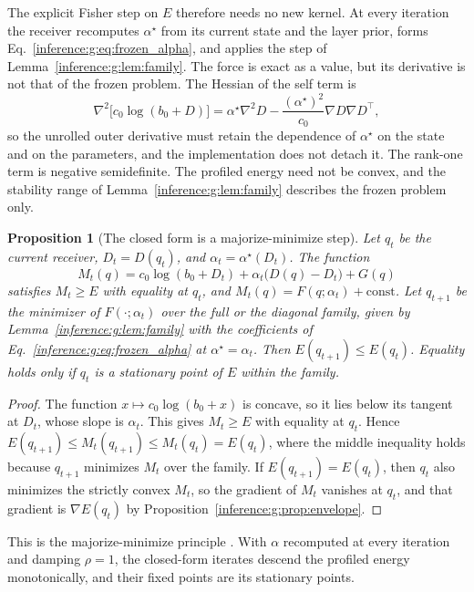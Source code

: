 \documentclass[11pt]{article}
\newtheorem{proposition}[theorem]{Proposition}
\theoremstyle{definition}
\theoremstyle{remark}
\begin{document}
The explicit Fisher step on $E$ therefore needs no new kernel. At every iteration the receiver recomputes $\alpha^\star$ from its current state and the layer prior, forms Eq.~\eqref{inference:g:eq:frozen_alpha}, and applies the step of Lemma~\ref{inference:g:lem:family}. The force is exact as a value, but its derivative is not that of the frozen problem. The Hessian of the self term is
\begin{equation}
\nabla^2\bigl[c_0\log(b_0+D)\bigr]=\alpha^\star\nabla^2D-\frac{(\alpha^\star)^2}{c_0}\nabla D\nabla D^\top,
\end{equation}
so the unrolled outer derivative must retain the dependence of $\alpha^\star$ on the state and on the parameters, and the implementation does not detach it. The rank-one term is negative semidefinite. The profiled energy need not be convex, and the stability range of Lemma~\ref{inference:g:lem:family} describes the frozen problem only.

\begin{proposition}[The closed form is a majorize-minimize step]
\label{inference:g:prop:mm}
Let $q_t$ be the current receiver, $D_t=D(q_t)$, and $\alpha_t=\alpha^\star(D_t)$. The function
\begin{equation}
M_t(q)=c_0\log(b_0+D_t)+\alpha_t\bigl(D(q)-D_t\bigr)+G(q)
\end{equation}
satisfies $M_t\ge E$ with equality at $q_t$, and $M_t(q)=F(q;\alpha_t)+\text{const}$. Let $q_{t+1}$ be the minimizer of $F(\cdot;\alpha_t)$ over the full or the diagonal family, given by Lemma~\ref{inference:g:lem:family} with the coefficients of Eq.~\eqref{inference:g:eq:frozen_alpha} at $\alpha^\star=\alpha_t$. Then $E(q_{t+1})\le E(q_t)$. Equality holds only if $q_t$ is a stationary point of $E$ within the family.
\end{proposition}

\begin{proof}
The function $x\mapsto c_0\log(b_0+x)$ is concave, so it lies below its tangent at $D_t$, whose slope is $\alpha_t$. This gives $M_t\ge E$ with equality at $q_t$. Hence $E(q_{t+1})\le M_t(q_{t+1})\le M_t(q_t)=E(q_t)$, where the middle inequality holds because $q_{t+1}$ minimizes $M_t$ over the family. If $E(q_{t+1})=E(q_t)$, then $q_t$ also minimizes the strictly convex $M_t$, so the gradient of $M_t$ vanishes at $q_t$, and that gradient is $\nabla E(q_t)$ by Proposition~\ref{inference:g:prop:envelope}.
\end{proof}

This is the majorize-minimize principle \citep{inference:hunter2004mm}. With $\alpha$ recomputed at every iteration and damping $\rho=1$, the closed-form iterates descend the profiled energy monotonically, and their fixed points are its stationary points.
\end{document}
